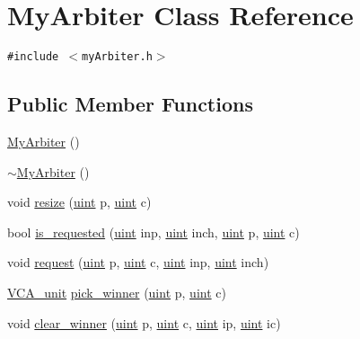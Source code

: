 \hypertarget{classMyArbiter}{
\section{MyArbiter Class Reference}
\label{classMyArbiter}
}
{\tt \#include $<$myArbiter.h$>$}

\subsection*{Public Member Functions}
\begin{CompactItemize}
\item 
\hyperlink{classMyArbiter_7050348ffbfcaba0645ec071d9695600}{MyArbiter} ()
\item 
\hyperlink{classMyArbiter_ba1f0d2abd1a1c993f3970a1c135a3c1}{$\sim$MyArbiter} ()
\item 
void \hyperlink{classMyArbiter_a2ae3de19a21c39f6bccf332976d2c81}{resize} (\hyperlink{outputBuffer_8h_91ad9478d81a7aaf2593e8d9c3d06a14}{uint} p, \hyperlink{outputBuffer_8h_91ad9478d81a7aaf2593e8d9c3d06a14}{uint} c)
\item 
bool \hyperlink{classMyArbiter_4fe8d6a9091e160c2c500bceb455ba71}{is\_\-requested} (\hyperlink{outputBuffer_8h_91ad9478d81a7aaf2593e8d9c3d06a14}{uint} inp, \hyperlink{outputBuffer_8h_91ad9478d81a7aaf2593e8d9c3d06a14}{uint} inch, \hyperlink{outputBuffer_8h_91ad9478d81a7aaf2593e8d9c3d06a14}{uint} p, \hyperlink{outputBuffer_8h_91ad9478d81a7aaf2593e8d9c3d06a14}{uint} c)
\item 
void \hyperlink{classMyArbiter_565ff83b3e9dbca9b2d92cdec6c1f5da}{request} (\hyperlink{outputBuffer_8h_91ad9478d81a7aaf2593e8d9c3d06a14}{uint} p, \hyperlink{outputBuffer_8h_91ad9478d81a7aaf2593e8d9c3d06a14}{uint} c, \hyperlink{outputBuffer_8h_91ad9478d81a7aaf2593e8d9c3d06a14}{uint} inp, \hyperlink{outputBuffer_8h_91ad9478d81a7aaf2593e8d9c3d06a14}{uint} inch)
\item 
\hyperlink{classVCA__unit}{VCA\_\-unit} \hyperlink{classMyArbiter_9ae248e0ec7f01d68b0ca4108f954d77}{pick\_\-winner} (\hyperlink{outputBuffer_8h_91ad9478d81a7aaf2593e8d9c3d06a14}{uint} p, \hyperlink{outputBuffer_8h_91ad9478d81a7aaf2593e8d9c3d06a14}{uint} c)
\item 
void \hyperlink{classMyArbiter_871cdb7c56ea8d1d28f05baea1e985b1}{clear\_\-winner} (\hyperlink{outputBuffer_8h_91ad9478d81a7aaf2593e8d9c3d06a14}{uint} p, \hyperlink{outputBuffer_8h_91ad9478d81a7aaf2593e8d9c3d06a14}{uint} c, \hyperlink{outputBuffer_8h_91ad9478d81a7aaf2593e8d9c3d06a14}{uint} ip, \hyperlink{outputBuffer_8h_91ad9478d81a7aaf2593e8d9c3d06a14}{uint} ic)

\end{CompactItemize}
